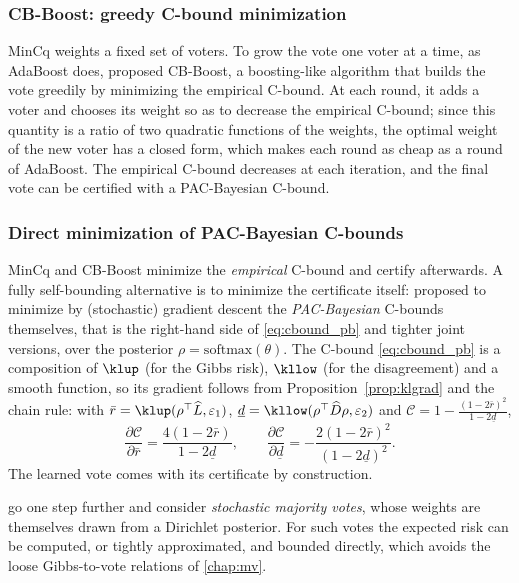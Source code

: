 \subsubsection{CB-Boost: greedy C-bound minimization}

MinCq weights a fixed set of voters. To grow the vote one voter at a time, as
AdaBoost does, \citet{bauvin2020fast} proposed CB-Boost, a boosting-like algorithm that builds
the vote greedily by minimizing the empirical C-bound. At each round, it adds a
voter and chooses its weight so as to decrease the empirical C-bound; since this
quantity is a ratio of two quadratic functions of the weights, the optimal weight
of the new voter has a closed form, which makes each round as cheap as a round of
AdaBoost. The empirical C-bound decreases at each iteration, and the final vote
can be certified with a PAC-Bayesian C-bound.

\subsubsection{Direct minimization of PAC-Bayesian C-bounds}

MinCq and CB-Boost minimize the \emph{empirical} C-bound and certify afterwards.
A fully self-bounding alternative is to minimize the certificate itself:
\citet{viallard2021self} proposed to minimize by (stochastic) gradient descent
the \emph{PAC-Bayesian} C-bounds themselves, that is the right-hand side of
\eqref{eq:cbound_pb} and tighter joint versions, over the posterior
$\rho=\mathrm{softmax}(\theta)$. The C-bound \eqref{eq:cbound_pb} is a composition of
$\klup$ (for the Gibbs risk), $\kllow$ (for the disagreement) and a smooth
function, so its gradient follows from Proposition~\ref{prop:klgrad} and the chain
rule: with $\bar r=\klup(\rho^\top\widehat L,\varepsilon_1)$, $\underline d=\kllow(\rho^\top\widehat D\rho,\varepsilon_2)$ and
$\mathcal C=1-\frac{(1-2\bar r)^2}{1-2\underline d}$,
\[
\frac{\partial\mathcal C}{\partial\bar r}=\frac{4(1-2\bar r)}{1-2\underline d},\qquad
\frac{\partial\mathcal C}{\partial\underline d}=-\frac{2(1-2\bar r)^2}{(1-2\underline d)^2}.
\]
The learned vote comes with its certificate by construction.

\citet{zantedeschi2021learning}
go one step further and consider \emph{stochastic majority votes}, whose weights
are themselves drawn from a Dirichlet posterior. For such votes the expected risk
can be computed, or tightly approximated, and bounded directly, which avoids the
loose Gibbs-to-vote relations of \cref{chap:mv}.

